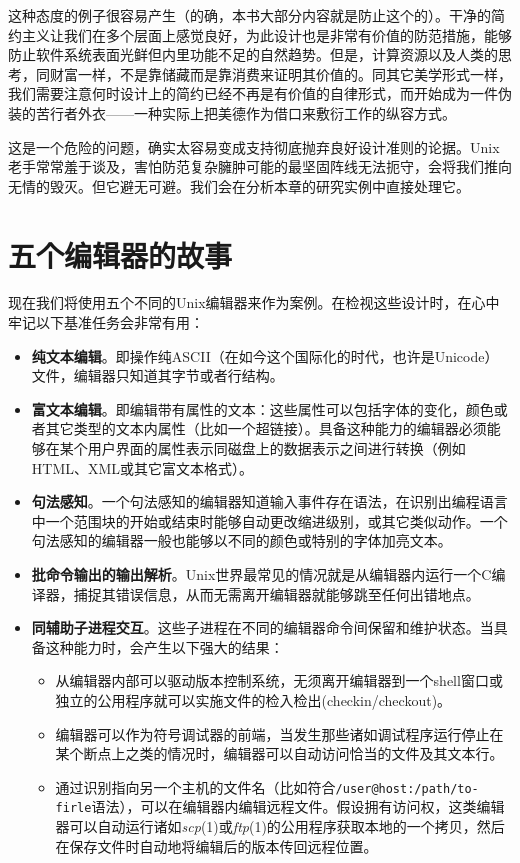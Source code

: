 \documentclass[12pt,oneside]{book}
\begin{document}
\begin{common-format}
这种态度的例子很容易产生（的确，本书大部分内容就是防止这个的）。干净的简约主义让我们在多个层面上感觉良好，为此设计也是非常有价值的防范措施，能够防止软件系统表面光鲜但内里功能不足的自然趋势。但是，计算资源以及人类的思考，同财富一样，不是靠储藏而是靠消费来证明其价值的。同其它美学形式一样，我们需要注意何时设计上的简约已经不再是有价值的自律形式，而开始成为一件伪装的苦行者外衣——一种实际上把美德作为借口来敷衍工作的纵容方式。

这是一个危险的问题，确实太容易变成支持彻底抛弃良好设计准则的论据。Unix老手常常羞于谈及，害怕防范复杂臃肿可能的最坚固阵线无法扼守，会将我们推向无情的毁灭。但它避无可避。我们会在分析本章的研究实例中直接处理它。


\section{五个编辑器的故事}
现在我们将使用五个不同的Unix编辑器来作为案例。在检视这些设计时，在心中牢记以下基准任务会非常有用：
\begin{itemize}
\item \textbf{纯文本编辑}。即操作纯ASCII（在如今这个国际化的时代，也许是Unicode）文件，编辑器只知道其字节或者行结构。
\item \textbf{富文本编辑}。即编辑带有属性的文本：这些属性可以包括字体的变化，颜色或者其它类型的文本内属性（比如一个超链接）。具备这种能力的编辑器必须能够在某个用户界面的属性表示同磁盘上的数据表示之间进行转换（例如HTML、XML或其它富文本格式）。
\item \textbf{句法感知}。一个句法感知的编辑器知道输入事件存在语法，在识别出编程语言中一个范围块的开始或结束时能够自动更改缩进级别，或其它类似动作。一个句法感知的编辑器一般也能够以不同的颜色或特别的字体加亮文本。
\item \textbf{批命令输出的输出解析}。Unix世界最常见的情况就是从编辑器内运行一个C编译器，捕捉其错误信息，从而无需离开编辑器就能够跳至任何出错地点。
\item \textbf{同辅助子进程交互}。这些子进程在不同的编辑器命令间保留和维护状态。当具备这种能力时，会产生以下强大的结果：
\begin{itemize}
\item 从编辑器内部可以驱动版本控制系统，无须离开编辑器到一个shell窗口或独立的公用程序就可以实施文件的检入检出(checkin/checkout)。
\item 编辑器可以作为符号调试器的前端，当发生那些诸如调试程序运行停止在某个断点上之类的情况时，编辑器可以自动访问恰当的文件及其文本行。
\item 通过识别指向另一个主机的文件名（比如符合\verb+/user@host:/path/to-firle+语法），可以在编辑器内编辑远程文件。假设拥有访问权，这类编辑器可以自动运行诸如\textit{scp}(1)或\textit{ftp}(1)的公用程序获取本地的一个拷贝，然后在保存文件时自动地将编辑后的版本传回远程位置。
\end{itemize}
\end{itemize}


\end{common-format}
\end{document}
